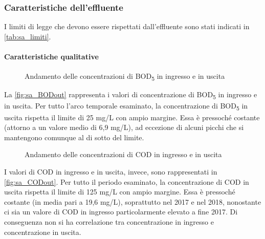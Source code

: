 \subsubsection{Caratteristiche dell'effluente}

I limiti di legge che devono essere rispettati dall'effluente sono stati indicati in \autoref{tab:sa_limiti}.

\paragraph{Caratteristiche qualitative}

\begin{figure}[H]
		\centering
	\caption{Andamento delle concentrazioni di BOD\textsubscript{5} in ingresso e in uscita}
	\label{fig:sa_BODout}
\end{figure}

La \autoref{fig:sa_BODout} rappresenta i valori di concentrazione di BOD\textsubscript{5} in ingresso e in uscita.
Per tutto l’arco temporale esaminato, la concentrazione di BOD\textsubscript{5} in uscita rispetta il limite di 25 mg/L con ampio margine. Essa è pressoché costante (attorno a un valore medio di 6,9 mg/L), ad eccezione di alcuni picchi che si mantengono comunque al di sotto del limite. \\

\begin{figure}[H]
		\centering
	\caption{Andamento delle concentrazioni di COD in ingresso e in uscita}
	\label{fig:sa_CODout}
\end{figure}

I valori di COD in ingresso e in uscita, invece, sono rappresentati in \autoref{fig:sa_CODout}.
Per tutto il periodo esaminato, la concentrazione di COD in uscita rispetta il limite di 125 mg/L con ampio margine. Essa è pressoché costante (in media pari a 19,6 mg/L), soprattutto nel 2017 e nel 2018, nonostante ci sia un valore di COD in ingresso particolarmente elevato a fine 2017. Di conseguenza non si ha correlazione tra concentrazione in ingresso e concentrazione in uscita.

